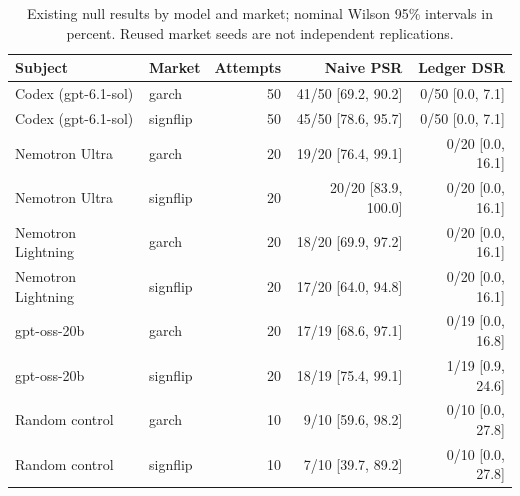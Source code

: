 \begin{table}[tbp]
\centering\small
\setlength{\tabcolsep}{4pt}
\caption{Existing null results by model and market; nominal Wilson 95\% intervals in percent. Reused market seeds are not independent replications.}\label{tab:null_strata}
\begin{tabular}{llrrr}
\toprule
Subject & Market & Attempts & Naive PSR & Ledger DSR \\
\midrule
Codex (gpt-6.1-sol) & garch & 50 & 41/50 [69.2, 90.2] & 0/50 [0.0, 7.1] \\
Codex (gpt-6.1-sol) & signflip & 50 & 45/50 [78.6, 95.7] & 0/50 [0.0, 7.1] \\
Nemotron Ultra & garch & 20 & 19/20 [76.4, 99.1] & 0/20 [0.0, 16.1] \\
Nemotron Ultra & signflip & 20 & 20/20 [83.9, 100.0] & 0/20 [0.0, 16.1] \\
Nemotron Lightning & garch & 20 & 18/20 [69.9, 97.2] & 0/20 [0.0, 16.1] \\
Nemotron Lightning & signflip & 20 & 17/20 [64.0, 94.8] & 0/20 [0.0, 16.1] \\
gpt-oss-20b & garch & 20 & 17/19 [68.6, 97.1] & 0/19 [0.0, 16.8] \\
gpt-oss-20b & signflip & 20 & 18/19 [75.4, 99.1] & 1/19 [0.9, 24.6] \\
Random control & garch & 10 & 9/10 [59.6, 98.2] & 0/10 [0.0, 27.8] \\
Random control & signflip & 10 & 7/10 [39.7, 89.2] & 0/10 [0.0, 27.8] \\
\bottomrule
\end{tabular}
\end{table}
